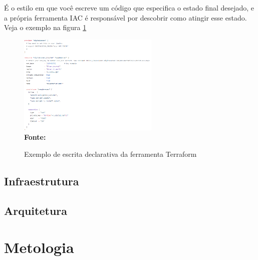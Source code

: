   É o estilo em que você escreve um código que especifica o estado final desejado, e a própria ferramenta IAC é responsável por descobrir como atingir esse estado. Veja o exemplo na figura \ref{fig:figura2}
 
 \begin{figure}[ht]
	\centering	
	\caption[\hspace{0.1cm}Exemplo declarativo]{Exemplo de escrita declarativa da ferramenta Terraform}
	\vspace{-0.4cm}
	\includegraphics[width=0.6\textwidth]{figuras/terraform-declarative-exemple-01.png}
	 \vspace{-0.2cm}
	\\\textbf{\footnotesize Fonte: \cite{terraform01}}
	\label{fig:figura2}
\end{figure}
\vspace{-0.5cm}

 \subsection{Infraestrutura}
 
 
 
\subsection{Arquitetura}

 



\section{\esp Metologia}
  
 


 